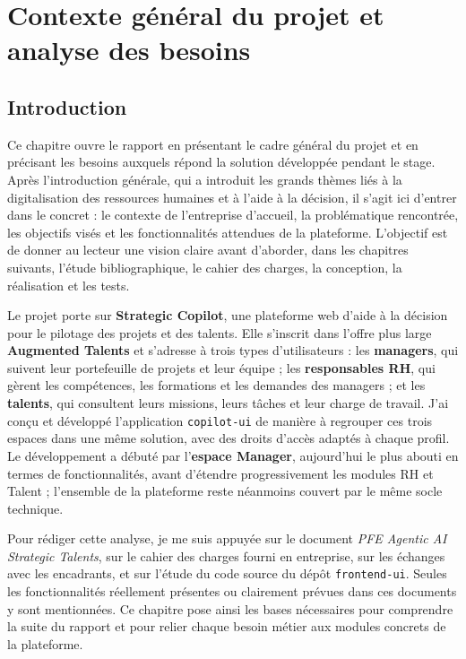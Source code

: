 \chapter{Contexte général du projet et analyse des besoins}

\section{Introduction}

Ce chapitre ouvre le rapport en présentant le cadre général du projet et en précisant les besoins auxquels répond la solution développée pendant le stage. Après l'introduction générale, qui a introduit les grands thèmes liés à la digitalisation des ressources humaines et à l'aide à la décision, il s'agit ici d'entrer dans le concret : le contexte de l'entreprise d'accueil, la problématique rencontrée, les objectifs visés et les fonctionnalités attendues de la plateforme. L'objectif est de donner au lecteur une vision claire avant d'aborder, dans les chapitres suivants, l'étude bibliographique, le cahier des charges, la conception, la réalisation et les tests.

Le projet porte sur \textbf{Strategic Copilot}, une plateforme web d'aide à la décision pour le pilotage des projets et des talents. Elle s'inscrit dans l'offre plus large \textbf{Augmented Talents} et s'adresse à trois types d'utilisateurs : les \textbf{managers}, qui suivent leur portefeuille de projets et leur équipe ; les \textbf{responsables RH}, qui gèrent les compétences, les formations et les demandes des managers ; et les \textbf{talents}, qui consultent leurs missions, leurs tâches et leur charge de travail. J'ai conçu et développé l'application \texttt{copilot-ui} de manière à regrouper ces trois espaces dans une même solution, avec des droits d'accès adaptés à chaque profil. Le développement a débuté par l'\textbf{espace Manager}, aujourd'hui le plus abouti en termes de fonctionnalités, avant d'étendre progressivement les modules RH et Talent ; l'ensemble de la plateforme reste néanmoins couvert par le même socle technique.

Pour rédiger cette analyse, je me suis appuyée sur le document \emph{PFE Agentic AI Strategic Talents}, sur le cahier des charges fourni en entreprise, sur les échanges avec les encadrants, et sur l'étude du code source du dépôt \texttt{frontend-ui}. Seules les fonctionnalités réellement présentes ou clairement prévues dans ces documents y sont mentionnées. Ce chapitre pose ainsi les bases nécessaires pour comprendre la suite du rapport et pour relier chaque besoin métier aux modules concrets de la plateforme.


